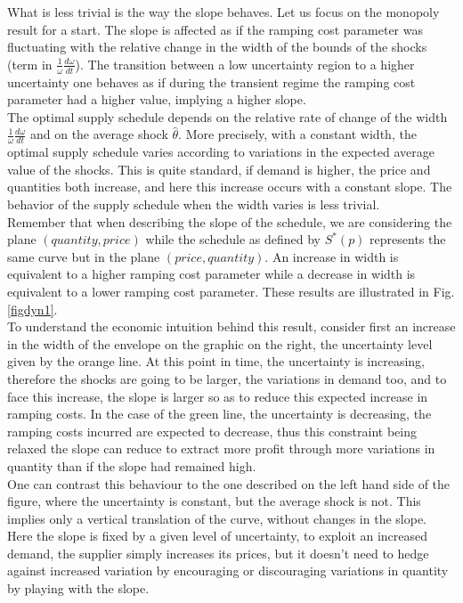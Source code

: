 What is less trivial is the way the slope behaves. Let us focus on the monopoly result for a start. The slope is affected as if the ramping cost parameter was fluctuating with the relative change in the width of the bounds of the shocks (term in $\frac{1}{\omega}\frac{d\omega}{dt} $). The transition between a low uncertainty region to a higher uncertainty one behaves as if during the transient regime the ramping cost parameter had a higher value, implying a higher slope. \\
         
The optimal supply schedule depends on the relative rate of change of the width $\frac{1}{\omega}\frac{d\omega}{dt}$ and on the average shock $\hat{\theta}$. More precisely, with a constant width, the optimal supply schedule varies according to variations in the expected average value of the shocks. This is quite standard, if demand is higher, the price and quantities both increase, and here this increase occurs with a constant slope. The behavior of the supply schedule when the width varies is less trivial. \\

Remember that when describing the slope of the schedule, we are considering the plane $(quantity, price)$ while the schedule as defined by $S^*(p)$ represents the same curve but in the plane $(price, quantity)$. An increase in width is equivalent to a higher ramping cost parameter while a decrease in width is equivalent to a lower ramping cost parameter. These results are illustrated in Fig. \ref{figdyn1}. \\

To understand the economic intuition behind this result, consider first an increase in the width of the envelope on the graphic on the right, the uncertainty level given by the orange line. At this point in time, the uncertainty is increasing, therefore the shocks are going to be larger, the variations in demand too, and to face this increase, the slope is larger so as to reduce this expected increase in ramping costs. In the case of the green line, the uncertainty is decreasing, the ramping costs incurred are expected to decrease, thus this constraint being relaxed the slope can reduce to extract more profit through more variations in quantity than if the slope had remained high.\\

One can contrast this behaviour to the one described on the left hand side of the figure, where the uncertainty is constant, but the average shock is not. This implies only a vertical translation of the curve, without changes in the slope. Here the slope is fixed by a given level of uncertainty, to exploit an increased demand, the supplier simply increases its prices, but it doesn't need to hedge against increased variation by encouraging or discouraging variations in quantity by playing with the slope.\\


